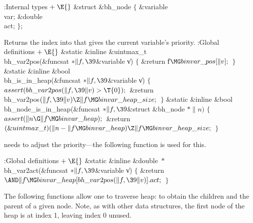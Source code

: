 \Y\B\4:Internal types\X${}\mathrel+\E{}$\6
\&{struct} \&{bh\_node} ${}\{{}$\1\6
\&{variable} \\{var};\6
\&{double} \\{act};\2\6
${}\}{}$;\par
\fi

Returns the index into  that gives the
current variable's
priority.
\Y\B\4:Global definitions\X${}\mathrel+\E{}$\6
\&{static} \&{inline} \&{uintmax\_t} \\{bh\_var2pos}(\&{funcsat} ${}{*}\|f,%
\39{}$\&{variable} \|v)\1\1\2\2\6
${}\{{}$\1\6
\&{return} \|f${}\MG\\{binvar\_pos}[\|v];{}$\6
\4${}\}{}$\2\7
\&{static} \&{inline} \&{bool} \\{bh\_is\_in\_heap}(\&{funcsat} ${}{*}\|f,%
\39{}$\&{variable} \|v)\1\1\2\2\6
${}\{{}$\1\6
${}\\{assert}(\\{bh\_var2pos}(\|f,\39\|v)>\T{0});{}$\6
\&{return} \\{bh\_var2pos}${}(\|f,\39\|v)\Z\|f\MG\\{binvar\_heap\_size};{}$\6
\4${}\}{}$\2\7
\&{static} \&{inline} \&{bool} \\{bh\_node\_is\_in\_heap}(\&{funcsat} ${}{*}%
\|f,\39{}$\&{struct} \&{bh\_node} ${}{*}\|n){}$\1\1\2\2\6
${}\{{}$\1\6
${}\\{assert}(\|n\G\|f\MG\\{binvar\_heap});{}$\6
\&{return} ${}(\&{uintmax\_t})(\|n-\|f\MG\\{binvar\_heap})\Z\|f\MG\\{binvar%
\_heap\_size};{}$\6
\4${}\}{}$\2\par
\fi

 needs to adjust the priority---the
following function
is used for this.

\Y\B\4:Global definitions\X${}\mathrel+\E{}$\6
\&{static} \&{inline} \&{double} ${}{*}{}$\\{bh\_var2act}(\&{funcsat} ${}{*}%
\|f,\39{}$\&{variable} \|v)\1\1\2\2\6
${}\{{}$\1\6
\&{return} ${}{\AND}\|f\MG\\{binvar\_heap}[\\{bh\_var2pos}(\|f,\39\|v)].%
\\{act};{}$\6
\4${}\}{}$\2\par
\fi

The following functions allow one to traverse heap: to obtain the
children and
the parent of a given node. Note, as with other  data
structures, the
first node of the heap is at index 1, leaving index 0 unused.

